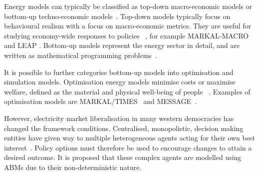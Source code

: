 
Energy models can typically be classified as top-down macro-economic models or bottom-up techno-economic models~\cite{Bohringer1998}. Top-down models typically focus on behavioural realism with a focus on macro-economic metrics. They are useful for studying economy-wide responses to policies ~\cite{Hall2016}, for example MARKAL-MACRO \cite{Fishbone1981} and LEAP \cite{Heaps2016}. Bottom-up models represent the energy sector in detail, and are written as mathematical programming problems~\cite{Gargiulo2013}. %

It is possible to further categorise bottom-up models into optimisation and simulation models. Optimisation energy models minimise costs or maximise welfare, defined as the material and physical well-being of people ~\cite{Keles2017}. Examples of optimisation models are MARKAL/TIMES~\cite{Fishbone1981} and MESSAGE~\cite{Schrattenholzer1981}. %

However, electricity market liberalisation in many western democracies has changed the framework conditions. Centralised, monopolistic, decision making entities have given way to multiple heterogeneous agents acting for their own best interest~\cite{Most2010}. Policy options must therefore be used to encourage changes to attain a desired outcome. It is proposed that these complex agents are modelled using ABMs due to their non-deterministic nature. 



